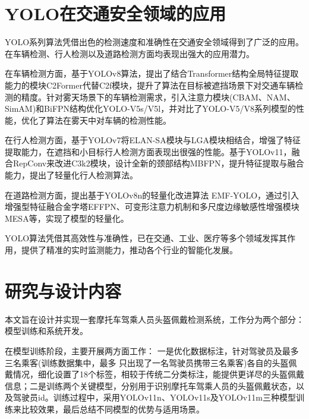 
\section{YOLO在交通安全领域的应用}
YOLO系列算法凭借出色的检测速度和准确性在交通安全领域得到了广泛的应用。在车辆检测、行人检测以及道路检测方面均表现出强大的应用潜力。

在车辆检测方面，\textcite{ex1}基于YOLOv8算法，提出了结合Transformer结构全局特征提取能力的模块C2Former代替C2f模块，提升了算法在目标被遮挡场景下对交通车辆检测的精度。\textcite{ex2}针对雾天场景下的车辆检测需求，引入注意力模块(CBAM、NAM、SimAM)和BiFPN结构优化YOLO-V5s/V5l，并对比了YOLO-V5/V8系列模型的性能，优化了算法在雾天中对车辆的检测性能。

在行人检测方面，\textcite{ex3}基于YOLOv7将ELAN-SA模块与LGA模块相结合，增强了特征提取能力，在遮挡和小目标行人检测方面表现出很强的性能。\textcite{ex4}基于YOLOv11，融合RepConv来改进C3k2模块，设计全新的颈部结构MBFPN，提升特征提取与融合能力，提出了轻量化行人检测算法。

在道路检测方面，\textcite{ex5}提出基于YOLOv8n的轻量化改进算法 EMF-YOLO，通过引入增强型特征融合金字塔EFFPN、可变形注意力机制和多尺度边缘敏感性增强模块MESA等，实现了模型的轻量化。 

YOLO算法凭借其高效性与准确性，已在交通、工业、医疗等多个领域发挥其作用，提供了精准的实时监测能力，推动各个行业的智能化发展。

\section{研究与设计内容}
本文旨在设计并实现一套摩托车驾乘人员头盔佩戴检测系统，工作分为两个部分：模型训练和系统开发。

在模型训练阶段，主要开展两方面工作：
一是优化数据标注，针对驾驶员及最多三名乘客(训练数据集中，最多 只出现了一名驾驶员携带三名乘客)各自的头盔佩戴情况，细化设置了18个标签，相较于传统二分类标注，能提供更详尽的头盔佩戴信息；二是训练两个关键模型，分别用于识别摩托车驾乘人员的头盔佩戴状态，以及驾驶员id。训练过程中，采用YOLOv11n、YOLOv11s及YOLOv11m三种模型训练来比较效果，最后总结不同模型的优势与适用场景。

